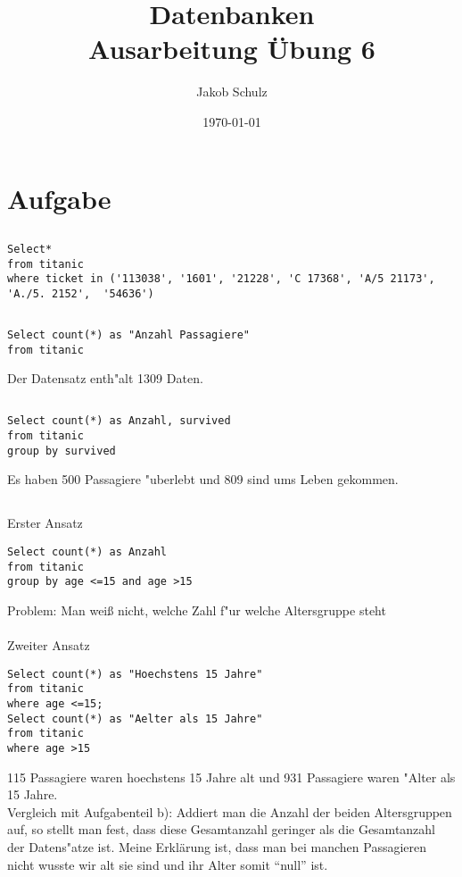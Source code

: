 \documentclass[a4paper, 11pt, titlepage]{article}
\begin{document}
\title{Datenbanken \\
Ausarbeitung \"Ubung 6}

\author{Jakob Schulz}

\date{\today}

\maketitle{\thispagestyle{plain}}

\section{Aufgabe}
\subsection{}
\begin{lstlisting}[style = sql]
Select*
from titanic
where ticket in ('113038', '1601', '21228', 'C 17368', 'A/5 21173', 'A./5. 2152',  '54636')
\end{lstlisting}
\subsection{}
\begin{lstlisting}[style = sql]
Select count(*) as "Anzahl Passagiere"
from titanic
\end{lstlisting}
Der Datensatz enth"alt 1309 Daten.
\subsection{}
\begin{lstlisting}[style = sql]
Select count(*) as Anzahl, survived
from titanic
group by survived
\end{lstlisting}
Es haben 500 Passagiere "uberlebt und 809 sind ums Leben gekommen.
\subsection{}
Erster Ansatz
\begin{lstlisting}[style = sql]
Select count(*) as Anzahl
from titanic
group by age <=15 and age >15
\end{lstlisting}
Problem: Man weiß nicht, welche Zahl f"ur welche Altersgruppe steht\\
\\
Zweiter Ansatz
\begin{lstlisting}[style = sql]
Select count(*) as "Hoechstens 15 Jahre"
from titanic
where age <=15;
Select count(*) as "Aelter als 15 Jahre"
from titanic
where age >15
\end{lstlisting}
115 Passagiere waren hoechstens 15 Jahre alt und 931 Passagiere waren "Alter als 15 Jahre.\\
Vergleich mit Aufgabenteil b): Addiert man die Anzahl der beiden Altersgruppen auf, so stellt man fest, dass diese Gesamtanzahl geringer als die Gesamtanzahl der Datens"atze ist. Meine Erklärung ist, dass man bei manchen Passagieren nicht wusste wir alt sie sind und ihr Alter somit "`null"' ist.
\end{document}
